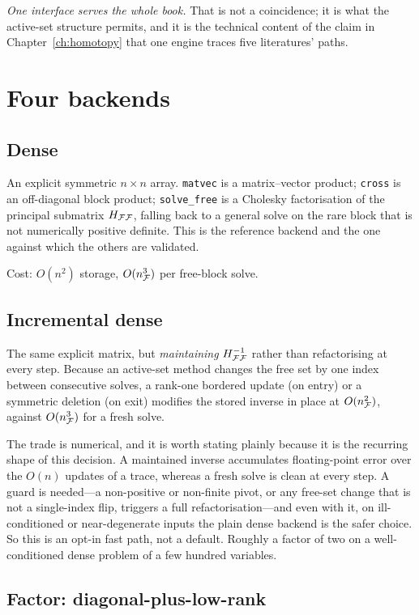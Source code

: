 \emph{One interface serves the whole book.} That is not a coincidence; it is what the
active-set structure permits, and it is the technical content of the claim in
Chapter~\ref{ch:homotopy} that one engine traces five literatures' paths.

\section{Four backends}

\subsection{Dense}

An explicit symmetric $n\times n$ array. \texttt{matvec} is a matrix--vector product;
\texttt{cross} is an off-diagonal block product; \texttt{solve\_free} is a Cholesky
factorisation of the principal submatrix $H_{\mathcal{F}\mathcal{F}}$, falling back to a general
solve on the rare block that is not numerically positive definite. This is the
reference backend and the one against which the others are validated.

Cost: $O(n^2)$ storage, $O(n_{\mathcal{F}}^3)$ per free-block solve.

\subsection{Incremental dense}

The same explicit matrix, but \emph{maintaining} $H_{\mathcal{F}\mathcal{F}}^{-1}$ rather than
refactorising at every step. Because an active-set method changes the free set by one
index between consecutive solves, a rank-one bordered update (on entry) or a symmetric
deletion (on exit) modifies the stored inverse in place at $O(n_{\mathcal{F}}^2)$, against
$O(n_{\mathcal{F}}^3)$ for a fresh solve.

The trade is numerical, and it is worth stating plainly because it is the recurring
shape of this decision. A maintained inverse accumulates floating-point error over the
$O(n)$ updates of a trace, whereas a fresh solve is clean at every step. A guard is
needed---a non-positive or non-finite pivot, or any free-set change that is not a
single-index flip, triggers a full refactorisation---and even with it, on
ill-conditioned or near-degenerate inputs the plain dense backend is the safer choice.
So this is an opt-in fast path, not a default. Roughly a factor of two on a
well-conditioned dense problem of a few hundred variables.

\subsection{Factor: diagonal-plus-low-rank}
\label{sec:factor}

